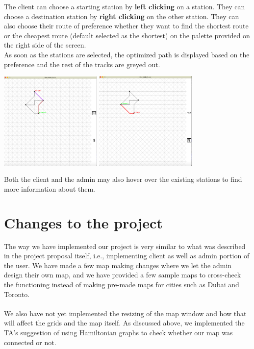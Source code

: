 \documentclass[fontsize=11pt]{article}
\begin{document}
    The client can choose a starting station by \textbf{left clicking} on a station. They can choose a destination station by \textbf{right clicking} on the other station. They can also choose their route of preference whether they want to find the shortest route or the cheapest route (default selected as the shortest) on the palette provided on the right side of the screen.\\
    As soon as the stations are selected, the optimized path is displayed based on the preference and the rest of the tracks are greyed out.\\
    \begin{center}
        \includegraphics[width = 5cm]{client shortest route.png} \quad
        \includegraphics[width = 5cm]{client cheapest route.png}
    \end{center}
    Both the client and the admin may also hover over the existing stations to find more information about them.

    \section*{Changes to the project}
    The way we have implemented our project is very similar to what was described in the project proposal itself, i.e., implementing client as well as admin portion of the user. We have made a few map making changes where we let the admin design their own map, and we have provided a few sample maps to cross-check the functioning instead of making pre-made maps for cities such as Dubai and Toronto.\\
    \\
    We also have not yet implemented the resizing of the map window and how that will affect the grids and the map itself. As discussed above, we implemented the TA's suggestion of using Hamiltonian graphs to check whether our map was connected or not.
\end{document}
